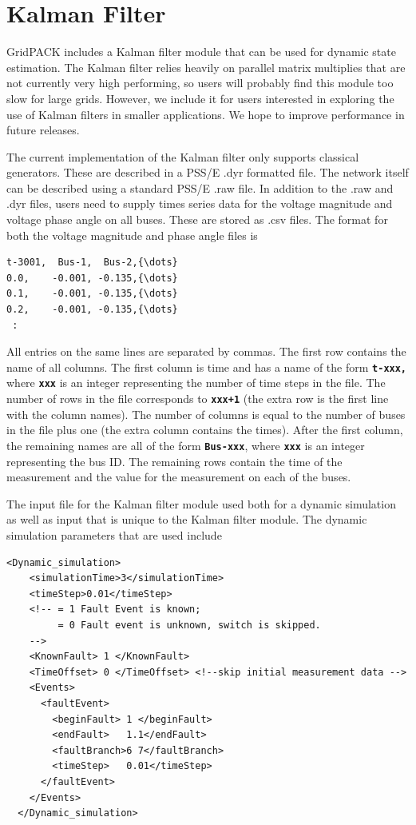 \section{Kalman Filter}

GridPACK includes a Kalman filter module that can be used for dynamic state estimation. The Kalman filter relies heavily on parallel matrix multiplies that are not currently very high performing, so users will probably find this module too slow for large grids. However, we include it for users interested in exploring the use of Kalman filters in smaller applications. We hope to improve performance in future releases.

The current implementation of the Kalman filter only supports classical generators. These are described in a PSS/E .dyr formatted file. The network itself can be described using a standard PSS/E .raw file. In addition to the .raw and .dyr files, users need to supply times series data for the voltage magnitude and voltage phase angle on all buses. These are stored as .csv files. The format for both the voltage magnitude and phase angle files is

{
\color{red}
\begin{Verbatim}[fontseries=b]
t-3001,  Bus-1,  Bus-2,{\dots}
0.0,    -0.001, -0.135,{\dots}
0.1,    -0.001, -0.135,{\dots}
0.2,    -0.001, -0.135,{\dots}
 :
\end{Verbatim}
}

All entries on the same lines are separated by commas. The first row contains the name of all columns. The first column is time and has a name of the form \texttt{\textbf{t-xxx,}} where \texttt{\textbf{xxx}} is an integer representing the number of time steps in the file. The number of rows in the file corresponds to \texttt{\textbf{xxx+1}} (the extra row is the first line with the column names). The number of columns is equal to the number of buses in the file plus one (the extra column contains the times). After the first column, the remaining names are all of the form \texttt{\textbf{Bus-xxx}}, where \texttt{\textbf{xxx}} is an integer representing the bus ID. The remaining rows contain the time of the measurement and the value for the measurement on each of the buses.

The input file for the Kalman filter module used both for a dynamic simulation as well as input that is unique to the Kalman filter module. The dynamic simulation parameters that are used include

{
\color{blue}
\begin{Verbatim}[fontseries=b]
  <Dynamic_simulation>
    <simulationTime>3</simulationTime>
    <timeStep>0.01</timeStep>
    <!-- = 1 Fault Event is known; 
         = 0 Fault event is unknown, switch is skipped. 
    -->
    <KnownFault> 1 </KnownFault>
    <TimeOffset> 0 </TimeOffset> <!--skip initial measurement data -->
    <Events>
      <faultEvent>
        <beginFault> 1 </beginFault>
        <endFault>   1.1</endFault>
        <faultBranch>6 7</faultBranch>
        <timeStep>   0.01</timeStep>
      </faultEvent>
    </Events>
  </Dynamic_simulation>
\end{Verbatim}
}

